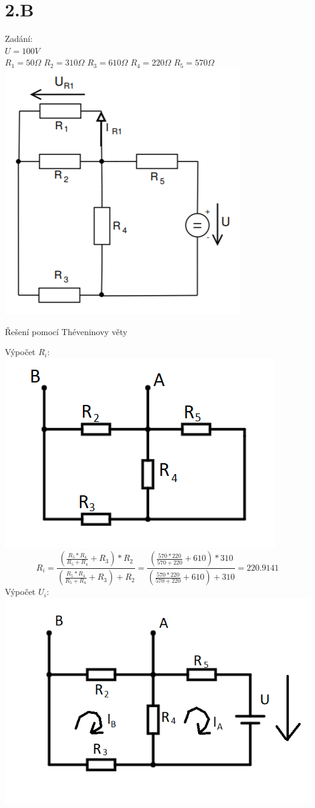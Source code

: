 \documentclass[11pt]{article}
\begin{document}
\section*{2.B}
Zadání:\\
$U = 100V$\\
$R_1 = 50\Omega$
$R_2 = 310\Omega$
$R_3 = 610\Omega$
$R_4 = 220\Omega$
$R_5 = 570\Omega$\\
\includegraphics[width=0.7\linewidth]{priklad2_zadani.png}\\
\centerline{\huge{Řešení pomocí Théveninovy věty}}
\newpage
Výpočet $R_i$:\\
\includegraphics[width=0.7\linewidth]{priklad2_Ri.png}
$$R_i = \frac{(\frac{R_5 * R_4}{R_5 + R_4} + R_3) * R_2}{(\frac{R_5 * R_4}{R_5 + R_4} + R_3) + R_2} = \frac{(\frac{570 * 220}{570 + 220} + 610) * 310}{(\frac{570 * 220}{570 + 220} + 610) + 310} = 220.9141$$
Výpočet $U_i$:\\
\includegraphics[width=0.7\linewidth]{priklad2_Ui.png}\\
\end{document}
